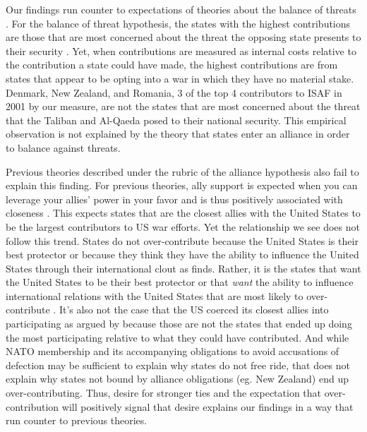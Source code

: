 \documentclass[12pt,letterpaper]{article}
\begin{document}
	Our findings run counter to expectations of theories about the balance of threats \citep{walt_originsalliance_1987}. For the balance of threat hypothesis, the states with the highest contributions are those that are most concerned about the threat the opposing state presents to their security \citep{haesebrouck_democraticparticipationair_2016}. Yet, when contributions are measured as internal costs relative to the contribution a state could have made, the highest contributions are from states that appear to be opting into a war in which they have no material stake. Denmark, New Zealand, and Romania, 3 of the top 4 contributors to ISAF in 2001 by our measure, are not the states that are most concerned about the threat that the Taliban and Al-Qaeda posed to their national security. This empirical observation is not explained by the theory that states enter an alliance in order to balance against threats.

	Previous theories described under the rubric of the alliance hypothesis also fail to explain this finding. For previous theories, ally support is expected when you can leverage your allies' power in your favor and is thus positively associated with closeness \citep{davidson_neoclassicalrealistexplanation_2011}. This expects states that are the closest allies with the United States to be the largest contributors to US war efforts. Yet the relationship we see does not follow this trend. States do not over-contribute because the United States is their best protector or because they think they have the ability to influence the United States through their international clout as \citet{ringsmose_natoburdensharingredux_2010} finds. Rather, it is the states that want the United States to be their best protector or that \textit{want} the ability to influence international relations with the United States that are most likely to over-contribute \citep{vonhlatky_greatasymmetryamerica_2010}. It's also not the case that the US coerced its closest allies into participating as argued by \citet{kupchan_natopersiangulf_1988} because those are not the states that ended up doing the most participating relative to what they could have contributed. And while NATO membership and its accompanying obligations to avoid accusations of defection may be sufficient to explain why states do not free ride, that does not explain why states not bound by alliance obligations (eg. New Zealand) end up over-contributing. Thus, desire for stronger ties and the expectation that over-contribution will positively signal that desire explains our findings in a way that run counter to previous theories.
\end{document}
